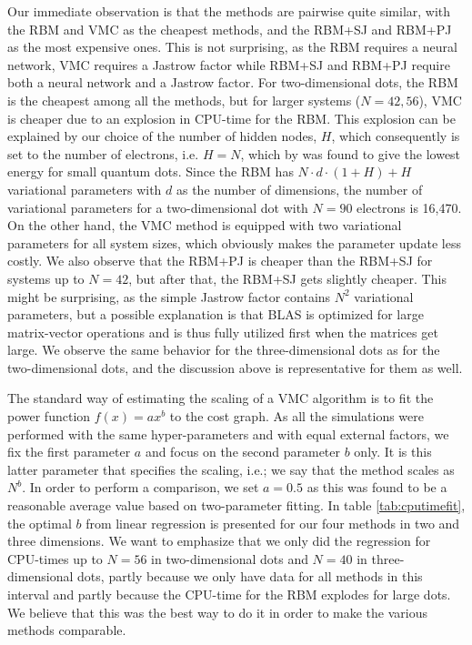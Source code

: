 Our immediate observation is that the methods are pairwise quite similar, with the RBM and VMC as the cheapest methods, and the RBM+SJ and RBM+PJ as the most expensive ones. This is not surprising, as the RBM requires a neural network, VMC requires a Jastrow factor while RBM+SJ and RBM+PJ require both a neural network and a Jastrow factor. For two-dimensional dots, the RBM is the cheapest among all the methods, but for larger systems ($N=42,56$), VMC is cheaper due to an explosion in CPU-time for the RBM. This explosion can be explained by our choice of the number of hidden nodes, $H$, which consequently is set to the number of electrons, i.e. $H=N$, which by \citet{nordhagen_computational_2018} was found to give the lowest energy for small quantum dots. Since the RBM has $N\cdot d\cdot (1+H)+H$ variational parameters with $d$ as the number of dimensions, the number of variational parameters for a two-dimensional dot with $N=90$ electrons is 16,470. On the other hand, the VMC method is equipped with two variational parameters for all system sizes, which obviously makes the parameter update less costly. We also observe that the RBM+PJ is cheaper than the RBM+SJ for systems up to $N=42$, but after that, the RBM+SJ gets slightly cheaper. This might be surprising, as the simple Jastrow factor contains $N^2$ variational parameters, but a possible explanation is that BLAS is optimized for large matrix-vector operations and is thus fully utilized first when the matrices get large. We observe the same behavior for the three-dimensional dots as for the two-dimensional dots, and the discussion above is representative for them as well.

The standard way of estimating the scaling of a VMC algorithm is to fit the power function $f(x)=ax^b$ to the cost graph. As all the simulations were performed with the same hyper-parameters and with equal external factors, we fix the first parameter $a$ and focus on the second parameter $b$ only. It is this latter parameter that specifies the scaling, i.e.; we say that the method scales as $N^b$. In order to perform a comparison, we set $a=0.5$ as this was found to be a reasonable average value based on two-parameter fitting. In table \eqref{tab:cputimefit}, the optimal $b$ from linear regression is presented for our four methods in two and three dimensions. We want to emphasize that we only did the regression for CPU-times up to $N=56$ in two-dimensional dots and $N=40$ in three-dimensional dots, partly because we only have data for all methods in this interval and partly because the CPU-time for the RBM explodes for large dots. We believe that this was the best way to do it in order to make the various methods comparable. 

